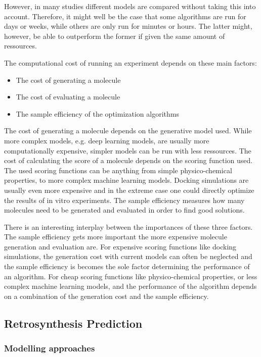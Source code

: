 However, in many studies different models are compared without taking this into account. Therefore,
it might well be the case that some algorithms are run for days or weeks, while others are only run
for minutes or hours. The latter might, however, be able to outperform the former if given the same
amount of ressources.

The computational cost of running an experiment depends on these main factors:
\begin{itemize}
      \item The cost of generating a molecule
      \item The cost of evaluating a molecule
      \item The sample efficiency of the optimization algorithms
\end{itemize}

The cost of generating a molecule depends on the generative model used. While more complex models,
e.g. deep learning models, are usually more computationally expensive, simpler models can be run
with less ressources. The cost of calculating the score of a molecule depends on the scoring
function used. The used scoring functions can be anything from simple physico-chemical properties,
to more complex machine learning models. Docking simulations are usually even more expensive and in
the extreme case one could directly optimize the results of in vitro experiments. The sample
efficiency measures how many molecules need to be generated and evaluated in order to find good
solutions.

There is an interesting interplay between the importances of these three factors. The sample
efficiency gets more important the more expensive molecule generation and evaluation are. For
expensive scoring functions like docking simulations, the generation cost with current models can
often be neglected and the sample efficiency is becomes the sole factor determining the performance
of an algorithm. For cheap scoring functions like physico-chemical properties, or less complex
machine learning models, and the performance of the algorithm depends on a combination of the
generation cost and the sample efficiency.

\subsection{Retrosynthesis Prediction\label{sec:retrosynthesis}}
\subsubsection{Modelling approaches}


